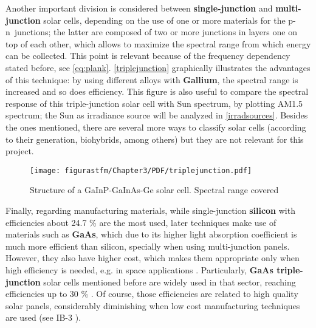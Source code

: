 			
			Another important division is considered between \textbf{single-junction} and \textbf{multi-junction} solar cells, depending on the use of one or more materials for the p-n~junctions; the latter are composed of two or more junctions in layers one on top of each other, which allows to maximize the spectral range from which energy can be collected. This point is relevant because of the frequency dependency stated before, see \autoref{eq:plank}. \autoref{triplejunction} graphically illustrates the advantages of this technique: by using different alloys with \textbf{Gallium}, the spectral range is increased and so does efficiency. This figure is also useful to compare the spectral response of this triple-junction solar cell with Sun spectrum, by plotting AM1.5 spectrum; the Sun as irradiance source will be analyzed in \ref{irradsources}. Besides the ones mentioned, there are several more ways to classify solar cells (according to their generation, biohybrids, among others) but they are not relevant for this project.
			
				\begin{figure} [H] 
				\centering
				\texttt{[image: figurastfm/Chapter3/PDF/triplejunction.pdf]}
				\caption{Structure of a GaInP-GaInAs-Ge solar cell. Spectral range covered \cite{phandphoto}}
				\label{triplejunction}
				\vspace{-1cm}
			\end{figure}
			
						
			
			Finally, regarding manufacturing materials, while single-junction \textbf{silicon} with efficiencies about 24.7 \% \cite{phandphoto} are the most used, later techniques make use of materials such as \textbf{GaAs}, which due to its higher light absorption coefficient is much more efficient than silicon, specially when using multi-junction panels. However, they also have higher cost, which makes them appropriate only when high efficiency is needed, e.g. in space applications \cite{wiki}. Particularly, \textbf{GaAs triple-junction} solar cells mentioned before are widely used in that sector, reaching efficiencies up to 30 \% \cite{azurspace}. Of course, those efficiencies are related to high quality solar panels, considerably diminishing when low cost manufacturing techniques are used (see IB-3 \cite{phandphoto}). 
 			 
